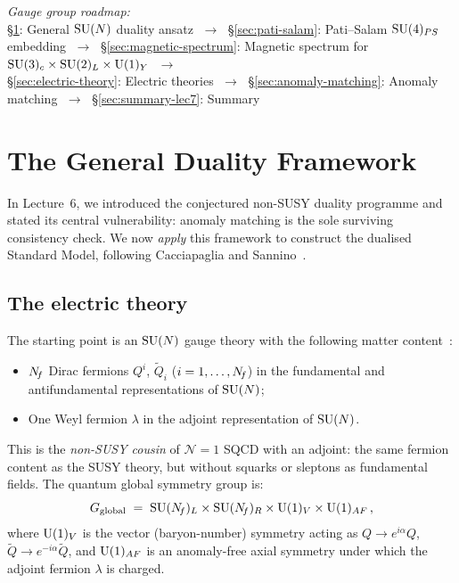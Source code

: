 \documentclass[11pt,a4paper]{article}
\begin{document}
\begin{center}
\textit{Gauge group roadmap:} \\[4pt]
\S\ref{sec:general-duality}: General $\mathrm{SU}(N)$ duality ansatz $\;\to\;$
\S\ref{sec:pati-salam}: Pati--Salam $\mathrm{SU}(4)_{PS}$ embedding $\;\to\;$
\S\ref{sec:magnetic-spectrum}: Magnetic spectrum for $\mathrm{SU}(3)_c \times \mathrm{SU}(2)_L \times \mathrm{U}(1)_Y$ $\;\to\;$\\[2pt]
\S\ref{sec:electric-theory}: Electric theories $\;\to\;$
\S\ref{sec:anomaly-matching}: Anomaly matching $\;\to\;$
\S\ref{sec:summary-lec7}: Summary
\end{center}

\section{The General Duality Framework}
\label{sec:general-duality}

In Lecture~6, we introduced the conjectured non-SUSY duality programme
and stated its central vulnerability: anomaly matching is the sole
surviving consistency check.  We now \emph{apply} this framework to
construct the dualised Standard Model, following Cacciapaglia and
Sannino~\cite{CacciapagliaSannino2024}.

\subsection{The electric theory}

The starting point is an $\mathrm{SU}(N)$ gauge theory with the following
matter content~\cite{CacciapagliaSannino2024}:
\begin{itemize}
  \item $N_{\!f}$ Dirac fermions $Q^i$, $\widetilde{Q}_i$
    ($i = 1,\ldots,N_{\!f}$) in the fundamental and antifundamental
    representations of $\mathrm{SU}(N)$;
  \item One Weyl fermion $\lambda$ in the adjoint representation of
    $\mathrm{SU}(N)$.
\end{itemize}
This is the \emph{non-SUSY cousin} of $\mathcal{N}=1$ SQCD with an
adjoint: the same fermion content as the SUSY theory, but without
squarks or sleptons as fundamental fields.  The quantum global symmetry
group is:
\begin{equation}\label{eq:electric-global}
  G_{\mathrm{global}}
  \;=\; \mathrm{SU}(N_{\!f})_L \times \mathrm{SU}(N_{\!f})_R \times \mathrm{U}(1)_V
  \times \mathrm{U}(1)_{AF}\,,
\end{equation}
where $\mathrm{U}(1)_V$ is the vector (baryon-number) symmetry acting as
$Q \to e^{i\alpha} Q$, $\widetilde{Q} \to e^{-i\alpha}\widetilde{Q}$,
and $\mathrm{U}(1)_{AF}$ is an anomaly-free axial symmetry under which the
adjoint fermion $\lambda$ is charged.
\end{document}
